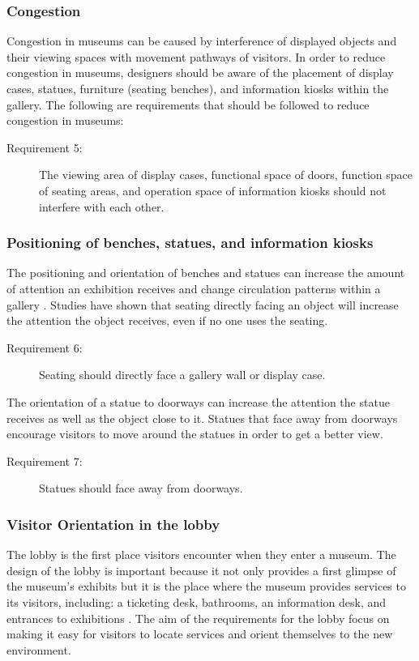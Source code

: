 \documentclass[12pt]{ucthesis}
\begin{document}
\subsubsection{Congestion}
Congestion in museums can be caused by interference of displayed objects and their viewing spaces with movement pathways of visitors. In order to reduce congestion in museums, designers should be aware of the placement of display cases, statues, furniture (seating benches), and information kiosks within the gallery. The following are requirements that should be followed to reduce congestion in museums:

\begin{description}
\item[Requirement 5:] The viewing area of display cases, functional space of doors, function space of seating areas, and operation space of information kiosks should not interfere with each other.
\end{description}

\subsubsection{Positioning of benches, statues, and information kiosks}
The positioning and orientation of benches and statues can increase the amount of attention an exhibition receives and change circulation patterns within a gallery \cite{Stavroulaki} \cite{Museum}. Studies have shown that seating directly facing an object will increase the attention the object receives, even if no one uses the seating. 

\begin{description}
\item[Requirement 6:] Seating should directly face a gallery wall or display case.
\end{description}

The orientation of a statue to doorways can increase the attention the statue receives as well as the object close to it. Statues that face away from doorways encourage visitors to move around the statues in order to get a better view.  
\begin{description}
\item[Requirement 7:] Statues should face away from doorways.
\end{description}

\subsubsection{Visitor Orientation in the lobby}
The lobby is the first place visitors encounter when they enter a museum. The design of the lobby is important because it not only provides a first glimpse of the museum's exhibits but it is the place where the museum provides services to its visitors, including: a ticketing desk, bathrooms, an information desk, and entrances to exhibitions \cite{Bitgood02}. The aim of the requirements for the lobby focus on making it easy for visitors to locate services and orient themselves to the new environment. 
\end{document}
